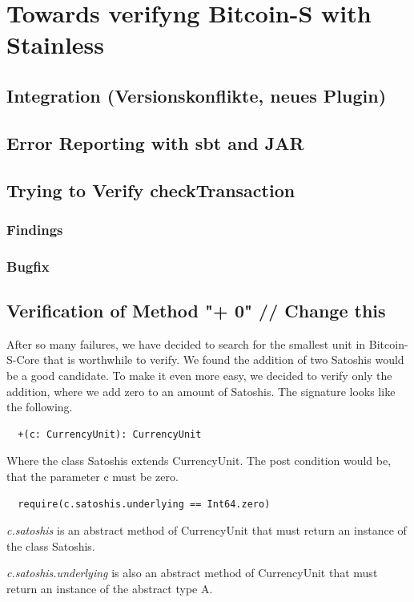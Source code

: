 \chapter{Towards verifyng Bitcoin-S with Stainless}
\label{chap:connecting}

\section{Integration (Versionskonflikte, neues Plugin)}


\section{Error Reporting with sbt and JAR}


\section{Trying to Verify checkTransaction}

\subsection{Findings}


\subsection{Bugfix}


\section{Verification of Method "+ 0" // Change this}
After so many failures, we have decided to search for the smallest unit in Bitcoin-S-Core that is worthwhile to verify.
We found the addition of two Satoshis would be a good candidate.
To make it even more easy, we decided to verify only the addition, where we add zero to an amount of Satoshis.
The signature looks like the following.
\begin{lstlisting}
  +(c: CurrencyUnit): CurrencyUnit
\end{lstlisting}
Where the class Satoshis extends CurrencyUnit.
The post condition would be, that the parameter c must be zero.
\begin{lstlisting}
  require(c.satoshis.underlying == Int64.zero)
\end{lstlisting}
\emph{c.satoshis} is an abstract method of CurrencyUnit that must return an instance of the class Satoshis.

\emph{c.satoshis.underlying} is also an abstract method of CurrencyUnit that must return an instance of the abstract type A.

